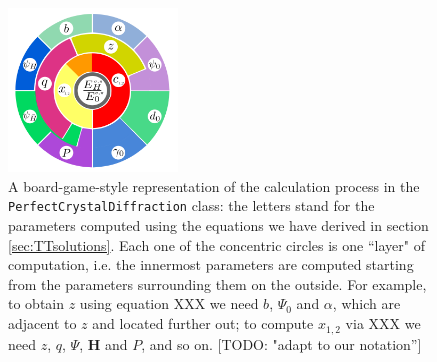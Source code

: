 \documentclass[preprint]{iucr}              %
\newcommand{\todo}[1]{{\color{red}[TODO: "#1'']}}
\begin{document}
\begin{figure}
    \centering
    \includegraphics[width=0.4\textwidth]{figures/edo_matryoshka.png}
    \caption{A board-game-style representation of the calculation process in the {\tt PerfectCrystalDiffraction} class: the letters stand for the parameters computed using the equations we have derived in section \ref{sec:TTsolutions}. Each one of the concentric circles is one ``layer" of computation, i.e. the innermost parameters are computed starting from the parameters surrounding them on the outside. 
    For example, to obtain $z$ using equation XXX we need $b$, $\Psi_0$  and $\alpha$, which are adjacent to $z$ and located further out; to compute $x_{1,2}$ via XXX we need $z$, $q$, $\Psi$, \textbf{H} and $P$, and so on. \todo{adapt to our notation}}
    \label{fig:edo_matryoshka}
\end{figure}



\end{document}
